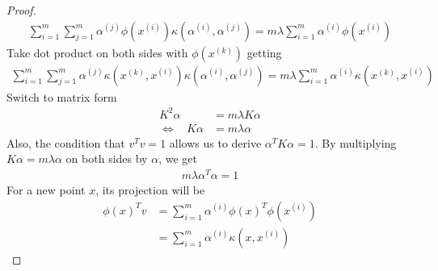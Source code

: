 \documentclass[8pt,landscape]{article}
\begin{document}
\begin{multicols}{3}
\begin{proof}
\begin{align*}
		\sum_{i=1}^m \sum_{j=1}^m \alpha^{(j)} \phi(x^{(i)}) \kappa(\alpha^{(i)}, \alpha^{(j)}) = m \lambda \sum_{i=1}^m \alpha^{(i)} \phi(x^{(i)})
	\end{align*}
	Take dot product on both sides with $\phi(x^{(k)})$ getting
	\begin{align*}
		\sum_{i=1}^m \sum_{j=1}^m \alpha^{(j)} \kappa(x^{(k)}, x^{(i)}) \kappa(\alpha^{(i)}, \alpha^{(j)}) = m \lambda \sum_{i=1}^m \alpha^{(i)} \kappa(x^{(k)}, x^{(i)})
	\end{align*}
	Switch to matrix form
	\begin{align*}
		K^2 \alpha &= m \lambda K \alpha\\
		\Leftrightarrow \ \ \ \ K \alpha &= m \lambda \alpha
	\end{align*}
	Also, the condition that $v^Tv = 1$ allows us to derive $\alpha^T K \alpha = 1$. By multiplying $K \alpha = m \lambda \alpha$ on both sides by $\alpha$, we get
	\begin{align*}
		m \lambda \alpha^T \alpha = 1
	\end{align*}
	For a new point $x$, its projection will be
	\begin{align*}
		\phi(x)^T v &= \sum_{i=1}^m \alpha^{(i)} \phi(x)^T \phi(x^{(i)})\\
		&= \sum_{i=1}^m \alpha^{(i)} \kappa (x, x^{(i)})
	\end{align*}
\end{proof}


\end{multicols}
\end{document}
